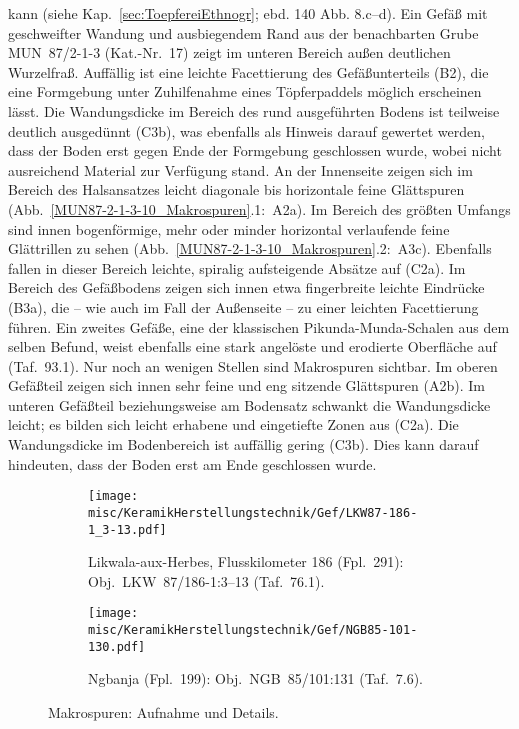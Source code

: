 kann (siehe Kap.~\ref{sec:ToepfereiEthnogr}; ebd. 140 Abb. 8.c--d). Ein Gefäß mit geschweifter Wandung und ausbiegendem Rand aus der benachbarten Grube MUN~87/2-1-3 (Kat.-Nr.~17) zeigt im unteren Bereich außen deutlichen Wurzelfraß. Auffällig ist eine leichte Facettierung des Gefäßunterteils (B2), die eine Formgebung unter Zuhilfenahme eines Töpferpaddels möglich erscheinen lässt. Die Wandungsdicke im Bereich des rund ausgeführten Bodens ist teilweise deutlich ausgedünnt (C3b), was ebenfalls als Hinweis darauf gewertet werden, dass der Boden erst gegen Ende der Formgebung geschlossen wurde, wobei nicht ausreichend Material zur Verfügung stand. An der Innenseite zeigen sich im Bereich des Halsansatzes leicht diagonale bis horizontale feine Glättspuren (Abb.~\ref{MUN87-2-1-3-10_Makrospuren}.1:~A2a). Im Bereich des größten Umfangs sind innen bogenförmige, mehr oder minder horizontal verlaufende feine Glättrillen zu sehen (Abb.~\ref{MUN87-2-1-3-10_Makrospuren}.2:~A3c). Ebenfalls fallen in dieser Bereich leichte, spiralig aufsteigende Absätze auf (C2a). Im Bereich des Gefäßbodens zeigen sich innen etwa fingerbreite leichte Eindrücke (B3a), die -- wie auch im Fall der Außenseite -- zu einer leichten Facettierung führen. Ein zweites Gefäße, eine der klassischen Pikunda-Munda-Schalen aus dem selben Befund, weist ebenfalls eine stark angelöste und erodierte Oberfläche auf (Taf.~93.1). Nur noch an wenigen Stellen sind Makrospuren sichtbar. Im oberen Gefäßteil zeigen sich innen sehr feine und eng sitzende Glättspuren (A2b). Im unteren Gefäßteil beziehungsweise am Bodensatz schwankt die Wandungsdicke leicht; es bilden sich leicht erhabene und eingetiefte Zonen aus (C2a). Die Wandungsdicke im Bodenbereich ist auffällig gering (C3b). Dies kann darauf hindeuten, dass der Boden erst am Ende geschlossen wurde.

\begin{figure*}[p]
	\centering
	\begin{subfigure}{\textwidth}
		\centering
		\texttt{[image: misc/KeramikHerstellungstechnik/Gef/LKW87-186-1\_3-13.pdf]}
		\caption{Likwala-aux-Herbes, Flusskilometer 186 (Fpl.~291): Obj.~LKW~87/186-1:3--13 (Taf.~76.1).\vspace{1em}}
		\label{LKW87-186-1_3-13_Makrospuren}
	\end{subfigure}
	\begin{subfigure}{\textwidth}
		\centering
		\texttt{[image: misc/KeramikHerstellungstechnik/Gef/NGB85-101-130.pdf]}
		\caption{Ngbanja (Fpl.~199): Obj.~NGB~85/101:131 (Taf.~7.6).}
		\label{NGB85-101-130-01_Makrospuren}
	\end{subfigure}
	\caption{Makrospuren: Aufnahme und Details.}
\end{figure*}

